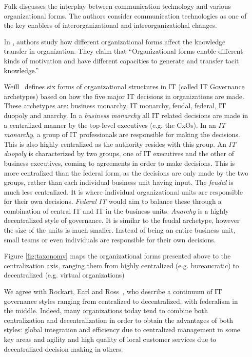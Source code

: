 Fulk \cite{fulk1995} discusses the interplay between communication technology and various organizational forms. The authors consider communication technologies as one of the key enablers of interorganizational and intreorganizatiohal changes.

In \cite{osterloh2000}, authors study how different organizational forms affect the knowledge transfer in organization. They claim that “Organizational forms enable different kinds of motivation and have different capacities to generate and transfer tacit knowledge.”

Weill~\cite{Weill2004} defines six forms of organizational structures in IT (called IT Governance archetypes) based on how the five major IT decisions in organizations are made. These archetypes are: business monarchy, IT monarchy, feudal, federal, IT duopoly and anarchy.   In a \textit{business monarchy} all IT related decisions are made in a centralized manner by the top-level executives (e.g. the CxOs). In an \textit{IT monarchy}, a group of IT professionals are responsible for making the decisions. This is also highly centralized as the authority resides with this group. An \textit{IT duopoly} is characterized by two groups, one of IT executives and the other of business executives, coming to agreements in order to make decisions. This is more centralized than the federal form, as the decisions are only made by the two groups, rather than each individual business unit having input. The \textit{feudal} is much less centralized. It is where individual organizational units are responsible for their own decisions. \textit{Federal IT  }would aim to balance these through a combination of central IT and IT in the business units. \textit{Anarchy} is a highly decentralized style of governance. It is similar to the feudal archetype, however the size of the units is much smaller. Instead of being an entire business unit, small teams or even individuals are responsible for their own decisions.

Figure \ref{fig:taxonomy} maps the organizational forms presented above to the centralization axis, ranging them from highly centralized (e.g. bureaucratic) to decentralized (e.g. virtual organizations)

We agree with Rockart, Earl and Ross~\cite{Rockart1996}, who describe a continuum of IT governance styles ranging from centralized to decentralized, with federalism in the middle. Indeed, many organizations today tend to combine both centralization and decentralization in order to obtain the advantages of both styles: global integration and efficiency due to centralized management in some key areas and agility and high quality of local customer services due to decentralized decision making in others. 

